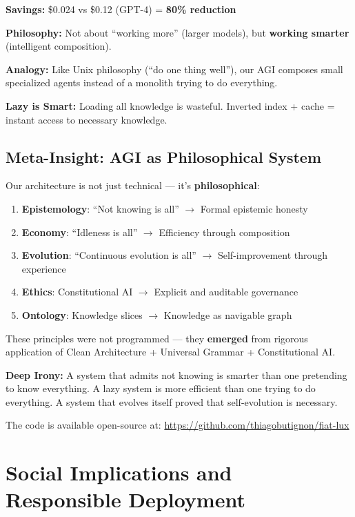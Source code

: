 \documentclass[11pt]{article}
\begin{document}
\textbf{Savings:} \$0.024 vs \$0.12 (GPT-4) = \textbf{80\% reduction}

\textbf{Philosophy:} Not about ``working more'' (larger models), but \textbf{working smarter} (intelligent composition).

\textbf{Analogy:} Like Unix philosophy (``do one thing well''), our AGI composes small specialized agents instead of a monolith trying to do everything.

\textbf{Lazy is Smart:} Loading all knowledge is wasteful. Inverted index + cache = instant access to necessary knowledge.

\subsection{Meta-Insight: AGI as Philosophical System}

Our architecture is not just technical --- it's \textbf{philosophical}:

\begin{enumerate}
    \item \textbf{Epistemology}: ``Not knowing is all'' $\rightarrow$ Formal epistemic honesty
    \item \textbf{Economy}: ``Idleness is all'' $\rightarrow$ Efficiency through composition
    \item \textbf{Evolution}: ``Continuous evolution is all'' $\rightarrow$ Self-improvement through experience
    \item \textbf{Ethics}: Constitutional AI $\rightarrow$ Explicit and auditable governance
    \item \textbf{Ontology}: Knowledge slices $\rightarrow$ Knowledge as navigable graph
\end{enumerate}

These principles were not programmed --- they \textbf{emerged} from rigorous application of Clean Architecture + Universal Grammar + Constitutional AI.

\textbf{Deep Irony:} A system that admits not knowing is smarter than one pretending to know everything. A lazy system is more efficient than one trying to do everything. A system that evolves itself proved that self-evolution is necessary.

The code is available open-source at:
\url{https://github.com/thiagobutignon/fiat-lux}

\section{Social Implications and Responsible Deployment}
\end{document}
